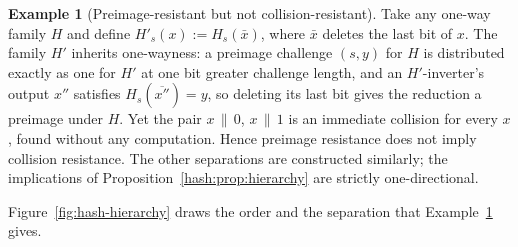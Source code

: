 \documentclass[11pt,a4paper]{article}
\theoremstyle{definition}
\newtheorem{example}[theorem]{Example}
\theoremstyle{remark}
\begin{document}
\begin{example}[Preimage-resistant but not collision-resistant]
\label{hash:ex:nonreversal}
Take any one-way family \(H\) and define \(H'_{s}(x) :=
H_{s}(\bar{x})\), where \(\bar{x}\) deletes the last bit of \(x\).
The family \(H'\) inherits one-wayness: a preimage challenge
\((s, y)\) for \(H\) is distributed exactly as one for \(H'\) at one
bit greater challenge length, and an \(H'\)-inverter's output
\(x''\) satisfies \(H_{s}(\overline{x''}) = y\), so deleting its last
bit gives the reduction a preimage under \(H\). Yet the pair
\(x \,\|\, 0\), \(x \,\|\, 1\) is
an immediate collision for every \(x\), found without any computation.
Hence preimage resistance does not imply collision resistance. The
other separations are constructed similarly; the implications of
Proposition~\ref{hash:prop:hierarchy} are strictly one-directional.
\end{example}

Figure~\ref{fig:hash-hierarchy} draws the order and the separation that
Example~\ref{hash:ex:nonreversal} gives.
\end{document}

